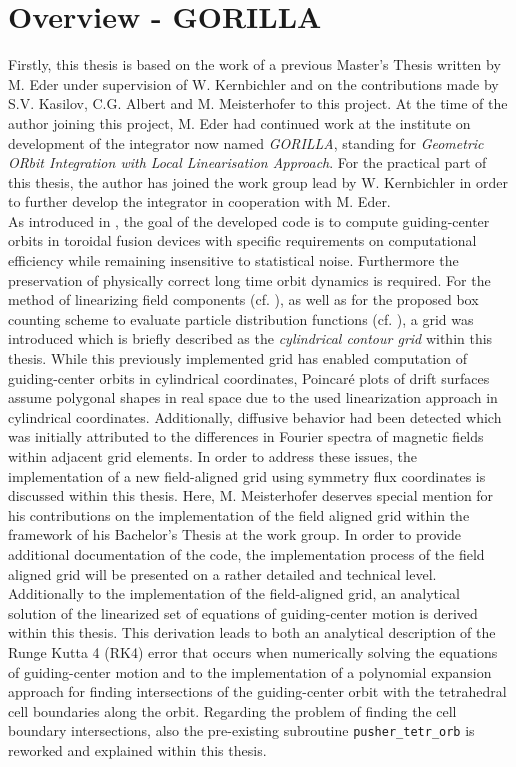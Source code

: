 \documentclass[main.tex]{subfiles}
\begin{document}
\section{Overview - GORILLA}
Firstly, this thesis is based on the work of a previous Master's Thesis written by M. Eder \cite{Eder_DA} under supervision of W. Kernbichler and on the contributions made by S.V. Kasilov, C.G. Albert and M. Meisterhofer to this project. At the time of the author joining this project, M. Eder had continued work at the institute on development of the integrator now named \textit{GORILLA}, standing for \textit{Geometric ORbit Integration with Local Linearisation Approach}. For the practical part of this thesis, the author has joined the work group lead by W. Kernbichler in order to further develop the integrator in cooperation with M. Eder.\\
As introduced in \cite{Eder_DA}, the goal of the developed code is to compute guiding-center orbits in toroidal fusion devices with specific requirements on computational efficiency while remaining insensitive to statistical noise. Furthermore the preservation of physically correct long time orbit dynamics is required. For the method of linearizing field components (cf. \cite{Eder_DA}), as well as for the proposed box counting scheme to evaluate particle distribution functions (cf. \cite{Eder_DA}), a grid was introduced which is briefly described as the \textit{cylindrical contour grid} within this thesis. While this previously implemented grid has enabled computation of guiding-center orbits in cylindrical coordinates, Poincar\'e plots of drift surfaces assume polygonal shapes in real space due to the used linearization approach in cylindrical coordinates. Additionally, diffusive behavior had been detected which was initially attributed to the differences in Fourier spectra of magnetic fields within adjacent grid elements. In order to address these issues, the implementation of a new field-aligned grid using symmetry flux coordinates is discussed within this thesis. Here, M. Meisterhofer deserves special mention for his contributions on the implementation of the field aligned grid within the framework of his Bachelor's Thesis at the work group. In order to provide additional documentation of the code, the implementation process of the field aligned grid will be presented on a rather detailed and technical level.\\
Additionally to the implementation of the field-aligned grid, an analytical solution of the linearized set of equations of guiding-center motion is derived within this thesis. This derivation leads to both an analytical description of the Runge Kutta 4 (RK4) error that occurs when numerically solving the equations of guiding-center motion and to the implementation of a polynomial expansion approach for finding intersections of the guiding-center orbit with the tetrahedral cell boundaries along the orbit. Regarding the problem of finding the cell boundary intersections, also the pre-existing subroutine  \texttt{pusher\_tetr\_orb} is reworked and explained within this thesis.\\
\end{document}
